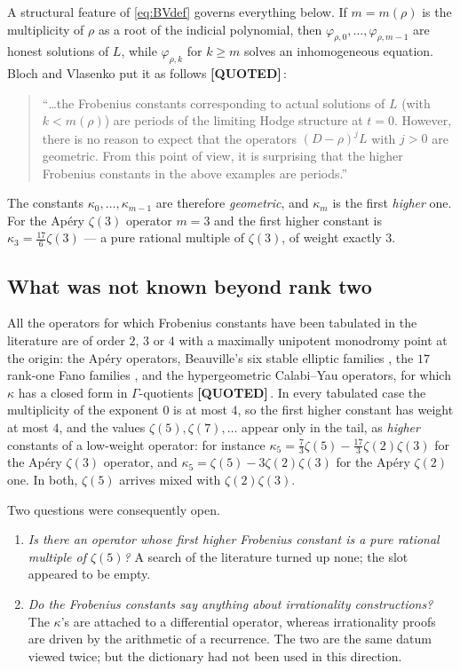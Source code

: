 \documentclass[11pt,reqno]{amsart}
\theoremstyle{plain}
\theoremstyle{definition}
\theoremstyle{remark}
\newcommand{\QUOTEDMARK}{{\normalfont\sffamily\bfseries[QUOTED]}}
\newcommand{\QUOTED}[1]{\QUOTEDMARK\,#1}
\begin{document}
A structural feature of \eqref{eq:BVdef} governs everything below. If $m=m(\rho)$ is the
multiplicity of $\rho$ as a root of the indicial polynomial, then $\varphi_{\rho,0},\dots,
\varphi_{\rho,m-1}$ are honest solutions of $L$, while $\varphi_{\rho,k}$ for $k\ge m$ solves an
inhomogeneous equation. Bloch and Vlasenko put it as follows \QUOTED{\cite[p.~21]{BV}}:

\begin{quote}
``\dots the Frobenius constants corresponding to actual solutions of $L$ (with $k<m(\rho)$) are
periods of the limiting Hodge structure at $t=0$. However, there is no reason to expect that
the operators $(D-\rho)^jL$ with $j>0$ are geometric. From this point of view, it is surprising
that the higher Frobenius constants in the above examples are periods.''
\end{quote}

The constants $\kappa_0,\dots,\kappa_{m-1}$ are therefore \emph{geometric}, and $\kappa_m$ is
the first \emph{higher} one. For the Ap\'ery $\zeta(3)$ operator $m=3$ and the first higher
constant is $\kappa_3=\tfrac{17}{6}\zeta(3)$ --- a pure rational multiple of $\zeta(3)$, of
weight exactly $3$.

\subsection{What was not known beyond rank two}
All the operators for which Frobenius constants have been tabulated in the literature are of
order $2$, $3$ or $4$ with a maximally unipotent monodromy point at the origin: the Ap\'ery
operators, Beauville's six stable elliptic families \cite{RV}, the $17$ rank-one Fano families
\cite{GZ1}, and the hypergeometric Calabi--Yau operators, for which $\kappa$ has a closed form
in $\Gamma$-quotients \QUOTED{\cite[Prop.~26]{BV}}. In every tabulated case the multiplicity of
the exponent $0$ is at most $4$, so the first higher constant has weight at most $4$, and the
values $\zeta(5),\zeta(7),\dots$ appear only in the tail, as \emph{higher} constants of a
low-weight operator: for instance $\kappa_5=\tfrac{7}{3}\zeta(5)-\tfrac{17}{3}\zeta(2)\zeta(3)$
for the Ap\'ery $\zeta(3)$ operator, and $\kappa_5=\zeta(5)-3\zeta(2)\zeta(3)$ for the Ap\'ery
$\zeta(2)$ one. In both, $\zeta(5)$ arrives mixed with $\zeta(2)\zeta(3)$.

Two questions were consequently open.

\begin{enumerate}[label=(\alph*),leftmargin=2.2em]
\item \emph{Is there an operator whose \textup{first} higher Frobenius constant is a pure
rational multiple of $\zeta(5)$?} A search of the literature turned up none; the slot appeared
to be empty.
\item \emph{Do the Frobenius constants say anything about irrationality constructions?} The
$\kappa$'s are attached to a differential operator, whereas irrationality proofs are driven by
the arithmetic of a recurrence. The two are the same datum viewed twice; but the dictionary had
not been used in this direction.
\end{enumerate}
\end{document}
